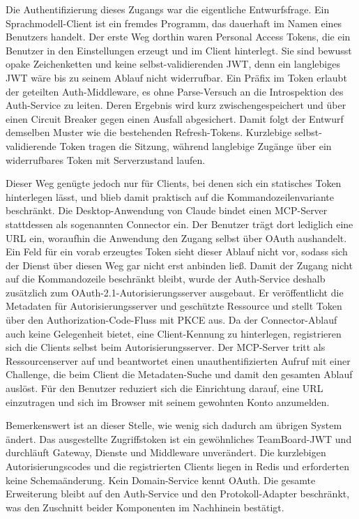 Die Authentifizierung dieses Zugangs war die eigentliche Entwurfsfrage. Ein Sprachmodell-Client ist ein fremdes Programm, das dauerhaft im Namen eines Benutzers handelt. Der erste Weg dorthin waren Personal Access Tokens, die ein Benutzer in den Einstellungen erzeugt und im Client hinterlegt. Sie sind bewusst opake Zeichenketten und keine selbst-validierenden JWT, denn ein langlebiges JWT wäre bis zu seinem Ablauf nicht widerrufbar. Ein Präfix im Token erlaubt der geteilten Auth-Middleware, es ohne Parse-Versuch an die Introspektion des Auth-Service zu leiten. Deren Ergebnis wird kurz zwischengespeichert und über einen Circuit Breaker gegen einen Ausfall abgesichert. Damit folgt der Entwurf demselben Muster wie die bestehenden Refresh-Tokens. Kurzlebige selbst-validierende Token tragen die Sitzung, während langlebige Zugänge über ein widerrufbares Token mit Serverzustand laufen.

Dieser Weg genügte jedoch nur für Clients, bei denen sich ein statisches Token hinterlegen lässt, und blieb damit praktisch auf die Kommandozeilenvariante beschränkt. Die Desktop-Anwendung von Claude bindet einen MCP-Server stattdessen als sogenannten Connector ein. Der Benutzer trägt dort lediglich eine URL ein, woraufhin die Anwendung den Zugang selbst über OAuth aushandelt. Ein Feld für ein vorab erzeugtes Token sieht dieser Ablauf nicht vor, sodass sich der Dienst über diesen Weg gar nicht erst anbinden ließ. Damit der Zugang nicht auf die Kommandozeile beschränkt bleibt, wurde der Auth-Service deshalb zusätzlich zum OAuth-2.1-Autorisierungsserver \cite{oauth21} ausgebaut. Er veröffentlicht die Metadaten für Autorisierungsserver und geschützte Ressource und stellt Token über den Authorization-Code-Fluss mit PKCE \cite{rfc7636} aus. Da der Connector-Ablauf auch keine Gelegenheit bietet, eine Client-Kennung zu hinterlegen, registrieren sich die Clients selbst beim Autorisierungsserver. Der MCP-Server tritt als Ressourcenserver auf und beantwortet einen unauthentifizierten Aufruf mit einer Challenge, die beim Client die Metadaten-Suche und damit den gesamten Ablauf auslöst. Für den Benutzer reduziert sich die Einrichtung darauf, eine URL einzutragen und sich im Browser mit seinem gewohnten Konto anzumelden.

Bemerkenswert ist an dieser Stelle, wie wenig sich dadurch am übrigen System ändert. Das ausgestellte Zugriffstoken ist ein gewöhnliches TeamBoard-JWT und durchläuft Gateway, Dienste und Middleware unverändert. Die kurzlebigen Autorisierungscodes und die registrierten Clients liegen in Redis und erforderten keine Schemaänderung. Kein Domain-Service kennt OAuth. Die gesamte Erweiterung bleibt auf den Auth-Service und den Protokoll-Adapter beschränkt, was den Zuschnitt beider Komponenten im Nachhinein bestätigt.

